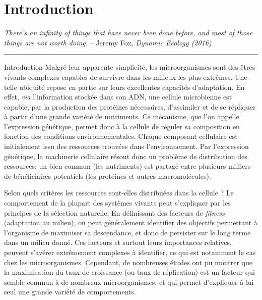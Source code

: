 \chapter{Introduction}
\label{chap:introduction}

\textit{There's an infinity of things that have never been done before, and most of those things are not worth doing.} -- Jeremy Fox, \textit{Dynamic Ecology (2016)}~\cite{fox_how_2016}

\begin{center}
\noindent\rule{4cm}{0.1pt}
\end{center}

\begin{chapter_summary}{Introduction}
Malgré leur apparente simplicité, les microorganismes sont des êtres vivants complexes capables de survivre dans les milieux les plus extrêmes.
Une telle ubiquité repose en partie sur leurs excellentes capacités d'adaptation.
En effet, \textit{via} l'information stockée dans son ADN, une cellule microbienne est capable, par la production des protéines nécessaires, d'assimiler et de se répliquer à partir d'une grande variété de nutriments.
Ce mécanisme, que l'on appelle l'expression génétique, permet donc à la cellule de réguler sa composition en fonction des conditions environnementales.
Chaque composant cellulaire est initialement issu des ressources trouvées dans l'environnement.
Par l'expression génétique, la machinerie cellulaire résout donc un problème de distribution des ressources: un bien commun (les nutriments) est partagé entre plusieurs milliers de bénéficiaires potentiels (les protéines et autres macromolécules).

Selon quels critères les ressources sont-elles distribuées dans la cellule ?
Le comportement de la plupart des systèmes vivants peut s'expliquer par les principes de la sélection naturelle.
En définissant des facteurs de \textit{fitness} (adaptation au milieu), on peut généralement identifier des objectifs permettant à l'organisme de maximiser sa descendance, et donc de persister sur le long terme dans un milieu donné.
Ces facteurs et surtout leurs importances relatives, peuvent s'avérer extrêmement complexes à identifier, 
ce qui est notamment le cas chez les microorganismes.
Cependant, de nombreuses études ont pu montrer que la maximisation du taux de croissance (ou taux de réplication) est un facteur qui semble commun à de nombreux microorganismes, et qui permet d'expliquer à lui seul une grande variété de comportements.


\end{chapter_summary}
